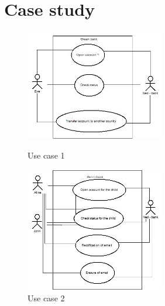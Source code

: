 \documentclass[11pt,english]{article}
\begin{document}
\section{Case study}
\begin{figure}[H]
\centering
\begin{minipage}{.5\textwidth}
  \centering
  \includegraphics[width=6cm,scale=0.5]{images/use case1.jpg}
  \caption{Use case 1}
  \label{fig:usecase1}
\end{minipage}%
\begin{minipage}{.5\textwidth}
  \centering
  \includegraphics[width=6cm,scale=0.5]{images/use case2.jpg}
  \caption{Use case 2}
  \label{fig:usecase2}
\end{minipage}
\end{figure}
\end{document}
